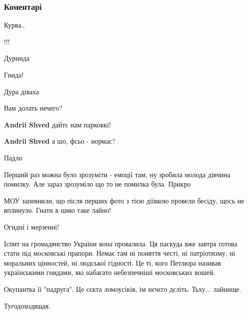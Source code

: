  
 
 
 
 
\subsubsection{Коментарі}

\begin{itemize} %
Курва..

!!!

Дуринда

Гнида!

Дура діваха

Вам долать нечего?

\begin{itemize} %
\textbf{Andrii Shved} дайтє нам парковкі!

\textbf{Andrii Shved} а шо, фсьо - нормас?
\end{itemize} %

Падло

Перший раз можна було зрозуміти - емоції там, ну зробила молода дівчина помилку.
Але зараз зрозуміло що то не помилка була. Прикро

МОУ запевнили, що після перших фото з тією діівкою провели бесіду, щось не вплинуло. Гнати в шию таке лайно!

Огидні і мерзенні!

Іспит на громадянство України вона провалила.
Ця паскуда вже завтра готова стати під московські прапори.
Немає там ні поняття честі, ні патріотизму, ні моральних цінностей, ні людської гідності.
Це ті, кого Петлюра називав українськими гнидами, які набагато небезпечніші московських вошей.

Окупантка її "падруга". Це сєкта ломоусіків, ім нєчєго дєліть. Тьху... лайнище.

Тугодоходящая.


\end{itemize}
